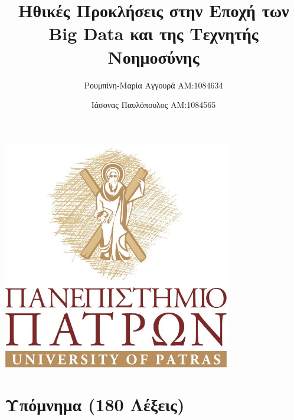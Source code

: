 \documentclass[12pt, A4]{article}
\newcommand{\tl}{\textlatin}
\begin{document}
    \begin{center} %
        \begin{minipage}{10cm}
            \includegraphics[width=10cm]{logo.jpg}
            \title{\bfseries\fontsize{32}{14}\selectfont Ηθικές Προκλήσεις στην Εποχή των \tl{Big Data} και της Τεχνητής Νοημοσύνης} 
            \author{Ρουμπίνη-Μαρία Αγγουρά ΑΜ:1084634 \and Ιάσονας Παυλόπουλος ΑΜ:1084565}
            \maketitle
        \end{minipage}
    \end{center}
    \newpage
    
    \tableofcontents
    
    \newpage
    
    \section{Υπόμνημα (180 Λέξεις)}
    
\end{document}

